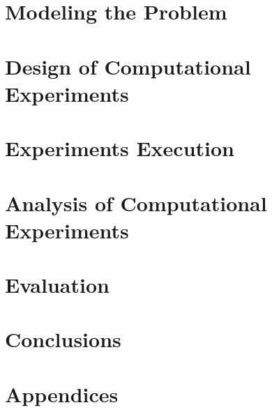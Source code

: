 \documentclass[letterpaper,12pt]{report}
\begin{document}
	\chapter{Modeling the Problem}
	\label{cha:modelingProblem}
	
	
	\chapter{Design of Computational Experiments}
	\label{cha:experimentDesign}
	

	\chapter{Experiments Execution}
	\label{cha:expExecution}
	

	\chapter{Analysis of Computational Experiments}
	\label{cha:experimentAnalysis}
		
	
	\chapter{Evaluation}
	\label{cha:evaluation}
	

	\chapter{Conclusions}
	\label{cha:conclusions}
	
	
	\chapter{Appendices}
	\label{cha:appendices}
	
		
%   
%	
	
	
	
\end{document}

